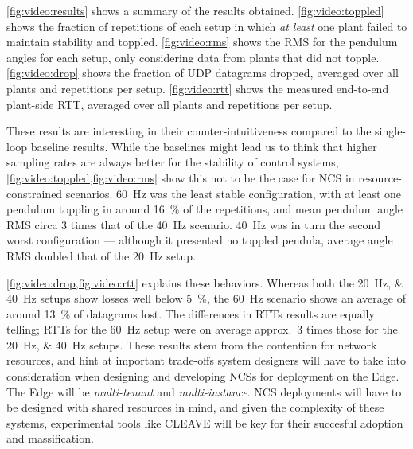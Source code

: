 \cref{fig:video:results} shows a summary of the results obtained.
\cref{fig:video:toppled} shows the fraction of repetitions of each setup in which \emph{at least} one plant failed to maintain stability and toppled.
\cref{fig:video:rms} shows the \ac{RMS} for the pendulum angles for each setup, only considering data from plants that did not topple.
\cref{fig:video:drop} shows the fraction of \ac{UDP} datagrams dropped, averaged over all plants and repetitions per setup.
\cref{fig:video:rtt} shows the measured end-to-end plant-side \ac{RTT}, averaged over all plants and repetitions per setup.

These results are interesting in their counter-intuitiveness compared to the single-loop baseline results.
While the baselines might lead us to think that higher sampling rates are always better for the stability of control systems, \cref{fig:video:toppled,fig:video:rms} show this not to be the case for \ac{NCS} in resource-constrained scenarios.
\SI{60}{\hertz} was the least stable configuration, with at least one pendulum toppling in around \SI{16}{\percent} of the repetitions, and mean pendulum angle \ac{RMS} circa \num{3} times that of the \SI{40}{\hertz} scenario.
\SI{40}{\hertz} was in turn the second worst configuration --- although it presented no toppled pendula, average angle \ac{RMS} doubled that of the \SI{20}{\hertz} setup.

\cref{fig:video:drop,fig:video:rtt} explains these behaviors.
Whereas both the \SIlist{20;40}{\hertz} setups show losses well below \SI{5}{\percent}, the \SI{60}{\hertz} scenario shows an average of around \SI{13}{\percent} of datagrams lost.
The differences in \acp{RTT} results are equally telling; \acp{RTT} for the \SI{60}{\hertz} setup were on average approx.\ \num{3} times those for the \SIlist{20;40}{\hertz} setups.
These results stem from the contention for network resources, and hint at important trade-offs system designers will have to take into consideration when designing and developing \acp{NCS} for deployment on the Edge.
The Edge will be \emph{multi-tenant} and \emph{multi-instance}. 
\ac{NCS} deployments will have to be designed with shared resources in mind, and given the complexity of these systems, experimental tools like \ac{CLEAVE} will be key for their succesful adoption and massification.
